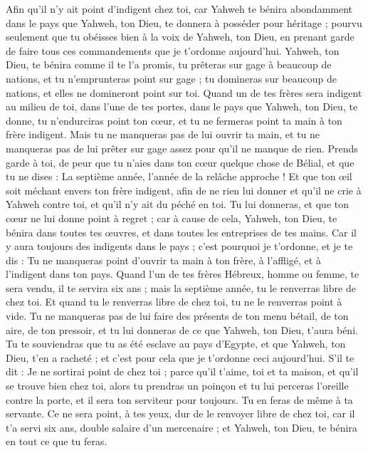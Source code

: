 \begin{multicols}{2}
Afin qu’il n'y ait point d’indigent chez toi, car Yahweh te bénira abondamment dans le pays que Yahweh, ton Dieu, te donnera à posséder pour héritage ;
pourvu seulement que tu obéisses bien à la voix de Yahweh, ton Dieu, en prenant garde de faire tous ces commandements que je t’ordonne aujourd'hui.
Yahweh, ton Dieu, te bénira comme il te l’a promis, tu prêteras sur gage à beaucoup de nations, et tu n'emprunteras point sur gage ; tu domineras sur beaucoup de nations, et elles ne domineront point sur toi.
Quand un de tes frères sera indigent au milieu de toi, dans l’une de tes portes, dans le pays que Yahweh, ton Dieu, te donne, tu n'endurciras point ton cœur, et tu ne fermeras point ta main à ton frère indigent.
Mais tu ne manqueras pas de lui ouvrir ta main, et tu ne manqueras pas de lui prêter sur gage assez pour qu’il ne manque de rien.
Prends garde à toi, de peur que tu n'aies dans ton cœur quelque chose de Bélial, et que tu ne dises : La septième année, l'année de la relâche approche ! Et que ton œil soit méchant envers ton frère indigent, afin de ne rien lui donner et qu’il ne crie à Yahweh contre toi, et qu'il n'y ait du péché en toi.
Tu lui donneras, et que ton cœur ne lui donne point à regret ; car à cause de cela, Yahweh, ton Dieu, te bénira dans toutes tes œuvres, et dans toutes les entreprises de tes mains.
Car il y aura toujours des indigents dans le pays ; c'est pourquoi je t’ordonne, et je te dis : Tu ne manqueras point d'ouvrir ta main à ton frère, à l'affligé, et à l’indigent dans ton pays.
Quand l’un de tes frères Hébreux, homme ou femme, te sera vendu, il te servira six ans ; mais la septième année, tu le renverras libre de chez toi.
Et quand tu le renverras libre de chez toi, tu ne le renverras point à vide.
Tu ne manqueras pas de lui faire des présents de ton menu bétail, de ton aire, de ton pressoir, et tu lui donneras de ce que Yahweh, ton Dieu, t'aura béni.
Tu te souviendras que tu as été esclave au pays d'Egypte, et que Yahweh, ton Dieu, t'en a racheté ; et c'est pour cela que je t’ordonne ceci aujourd'hui.
S’il te dit : Je ne sortirai point de chez toi ; parce qu'il t'aime, toi et ta maison, et qu'il se trouve bien chez toi,
alors tu prendras un poinçon et tu lui perceras l'oreille contre la porte, et il sera ton serviteur pour toujours. Tu en feras de même à ta servante.
Ce ne sera point, à tes yeux, dur de le renvoyer libre de chez toi, car il t'a servi six ans, double salaire d’un mercenaire ; et Yahweh, ton Dieu, te bénira en tout ce que tu feras.

\end{multicols}
